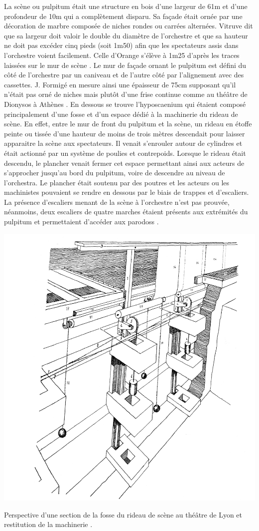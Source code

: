 		La scène ou \gls{pulpitum} était une structure en bois d'une largeur de 61m et d'une profondeur de 10m qui a complètement disparu. Sa façade était ornée par une décoration de marbre composée de niches rondes ou carrées alternées. Vitruve \cite[p. 10-11]{vitruve} dit que sa largeur doit valoir le double du diamètre de l'orchestre et que sa hauteur ne doit pas excéder cinq pieds (soit 1m50) afin que les spectateurs assis dans l'orchestre voient facilement. Celle d'Orange s'élève à 1m25 d'après les traces laissées sur le mur de scène \cite[p. 318-319]{orangeTxt}. Le mur de façade ornant le \gls{pulpitum} est défini du côté de l'orchestre par un caniveau et de l'autre côté par l'alignement avec des cassettes. J. Formigé en mesure ainsi une épaisseur de 75cm supposant qu'il n'était pas orné de niches mais plutôt d'une frise continue comme au théâtre de Dionysos à Athènes \cite[p. 457]{formigeBis}. En dessous se trouve l'\gls{hyposcaenium} qui étaient composé principalement d'une fosse et d'un espace dédié à la machinerie du rideau de scène. En effet, entre le mur de front du \gls{pulpitum} et la scène, un rideau en étoffe peinte ou tissée d'une hauteur de moins de trois mètres descendait pour laisser apparaitre la scène aux spectateurs. Il venait s'enrouler autour de cylindres et était actionné par un système de poulies et contrepoids. Lorsque le rideau était descendu, le plancher venait fermer cet espace permettant ainsi aux acteurs de s'approcher jusqu'au bord du \gls{pulpitum}, voire de descendre au niveau de l'\gls{orchestra}. Le plancher était soutenu par des poutres et les acteurs ou les machinistes pouvaient se rendre en dessous par le biais de trappes et d'escaliers. La présence d'escaliers menant de la scène à l'orchestre n'est pas prouvée, néanmoins, deux escaliers de quatre marches étaient présents aux extrémités du \gls{pulpitum} et permettaient d'accéder aux \glspl{parodos} \cite[p. 458]{formigeBis}.
		
	\begin{figureth}
		\includegraphics[width=0.6\linewidth]{images/rideau}
		\caption[Perspective d’une section de la fosse du rideau de scène au théâtre de Lyon]{Perspective d’une section de la fosse du rideau de scène au théâtre de Lyon et restitution de la machinerie \footnotemark.}
	\end{figureth}
						
